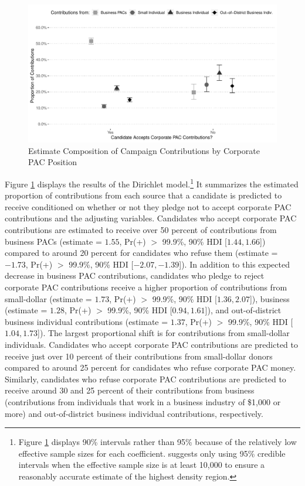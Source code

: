 \documentclass[12pt]{article}
\begin{document}
\begin{figure}[!htb]
    \centering
    \includegraphics[width=0.9\linewidth]{dir_model_results.pdf}
    \caption{Estimate Composition of Campaign Contributions by Corporate PAC Position}
    \label{fig: dir results}
\end{figure}

Figure \ref{fig: dir results} displays the results of the Dirichlet model.\footnote{Figure \ref{fig: dir results} displays 90\% intervals rather than 95\% because of the relatively low effective sample sizes for each coefficient. \citet{kruschke2014} suggests only using 95\% credible intervals when the effective sample size is at least 10,000 to ensure a reasonably accurate estimate of the highest density region.} It summarizes the estimated proportion of contributions from each source that a candidate is predicted to receive conditioned on whether or not they pledge not to accept corporate PAC contributions and the adjusting variables. Candidates who accept corporate PAC contributions are estimated to receive over 50 percent of contributions from business PACs (estimate = $1.55$, Pr(+) $>$ 99.9\%, 90\% HDI [$1.44, 1.66$]) compared to around 20 percent for candidates who refuse them (estimate = $-1.73$, Pr(+) $>$ 99.9\%, 90\% HDI [$-2.07, -1.39$]). In addition to this expected decrease in business PAC contributions, candidates who pledge to reject corporate PAC contributions receive a higher proportion of contributions from small-dollar (estimate = $1.73$, Pr(+) $>$ 99.9\%, 90\% HDI [$1.36, 2.07$]), business (estimate = $1.28$, Pr(+) $>$ 99.9\%, 90\% HDI [$0.94, 1.61$]), and out-of-district business individual contributions (estimate = $1.37$, Pr(+) $>$ 99.9\%, 90\% HDI [$1.04, 1.73$]). The largest proportional shift is for contributions from small-dollar individuals. Candidates who accept corporate PAC contributions are predicted to receive just over 10 percent of their contributions from small-dollar donors compared to around 25 percent for candidates who refuse corporate PAC money. Similarly, candidates who refuse corporate PAC contributions are predicted to receive around 30 and 25 percent of their contributions from business (contributions from individuals that work in a business industry of \$1,000 or more) and out-of-district business individual contributions, respectively. 
\end{document}
